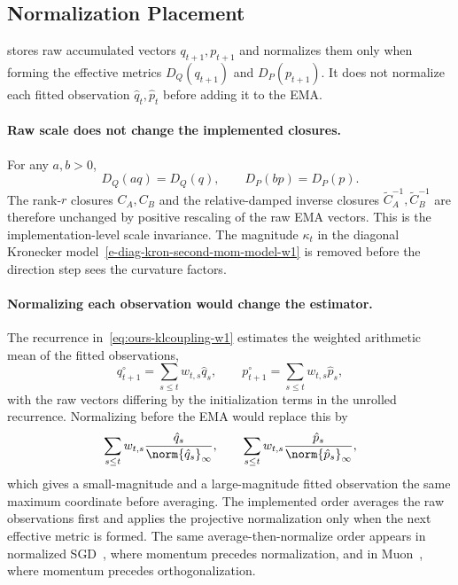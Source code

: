 \subsection{Normalization Placement}
\label{sec:scale-placement-w1}
\methodname{} stores raw accumulated vectors $q_{t+1},p_{t+1}$ and normalizes
them only when forming the effective metrics $D_Q(q_{t+1})$ and
$D_P(p_{t+1})$. It does not normalize each fitted observation
$\hat q_t,\hat p_t$ before adding it to the EMA.

\paragraph{Raw scale does not change the implemented closures.}
For any $a,b>0$,
\[
  D_Q(aq)=D_Q(q),
  \qquad
  D_P(bp)=D_P(p).
\]
The rank-$r$ closures $C_A,C_B$ and the relative-damped inverse closures
$\widetilde C_A^{-1},\widetilde C_B^{-1}$ are therefore unchanged by
positive rescaling of the raw EMA vectors. This is the implementation-level
scale invariance. The magnitude $\kappa_t$ in the diagonal Kronecker
model~\eqref{e-diag-kron-second-mom-model-w1} is removed before the
direction step sees the curvature factors.

\paragraph{Normalizing each observation would change the estimator.}
The recurrence in~\eqref{eq:ours-klcoupling-w1} estimates the weighted
arithmetic mean of the fitted observations,
\[
  q^\circ_{t+1}=\sum_{s\le t}w_{t,s}\hat q_s,
  \qquad
  p^\circ_{t+1}=\sum_{s\le t}w_{t,s}\hat p_s,
\]
with the raw vectors differing by the initialization terms in the unrolled
recurrence. Normalizing before the EMA would replace this by
\[
  \sum_{s\le t}w_{t,s}\frac{\hat q_s}{\norm{\hat q_s}_\infty},
  \qquad
  \sum_{s\le t}w_{t,s}\frac{\hat p_s}{\norm{\hat p_s}_\infty},
\]
which gives a small-magnitude and a large-magnitude fitted observation the
same maximum coordinate before averaging. The implemented order averages the
raw observations first and applies the projective normalization only when the
next effective metric is formed. The same average-then-normalize order appears
in normalized SGD~\cite{cutkosky_nigt}, where momentum precedes
normalization, and in Muon~\cite{denoise_ortho}, where momentum precedes
orthogonalization.
